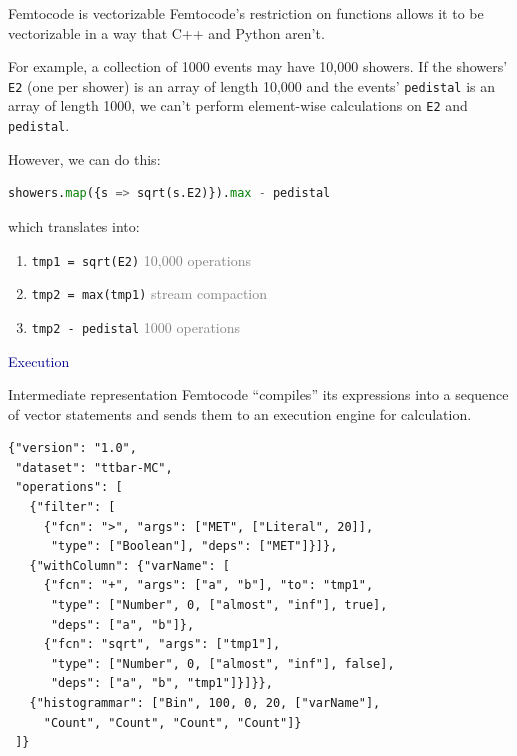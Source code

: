 \documentclass{beamer}
\begin{document}
\begin{frame}[fragile]{Femtocode is vectorizable}
\vspace{0.5 cm}
Femtocode's restriction on functions allows it to be vectorizable in a way that C++ and Python aren't.

\vspace{0.25 cm}
For example, a collection of 1000 events may have 10,000 showers. If the showers' {\small\tt E2} (one per shower) is an array of length 10,000 and the events' {\small\tt pedistal} is an array of length 1000, we can't perform element-wise calculations on {\small\tt E2} and {\small\tt pedistal}.

\vspace{0.25 cm}
However, we can do this:

\vspace{-0.25 cm}
\begin{center}
\begin{minipage}{0.9\linewidth}
\small
\begin{lstlisting}[language=python]
showers.map({s => sqrt(s.E2)}).max - pedistal
\end{lstlisting}
\end{minipage}
\end{center}

\vspace{-0.25 cm}
which translates into:
\begin{enumerate}
\item {\small\tt tmp1 = sqrt(E2)} \hfill \textcolor{gray}{10,000 operations}
\item {\small\tt tmp2 = max(tmp1)} \hfill \textcolor{gray}{stream compaction}
\item {\small\tt tmp2 - pedistal} \hfill \textcolor{gray}{1000 operations}
\end{enumerate}
\end{frame}

\begin{frame}{}
\begin{center}
\textcolor{darkblue}{\huge Execution}
\end{center}
\end{frame}

\begin{frame}[fragile]{Intermediate representation}
\vspace{0.4 cm}
Femtocode ``compiles'' its expressions into a sequence of vector statements and sends them to an execution engine for calculation.

\small
\begin{verbatim}
{"version": "1.0",
 "dataset": "ttbar-MC",
 "operations": [
   {"filter": [
     {"fcn": ">", "args": ["MET", ["Literal", 20]],
      "type": ["Boolean"], "deps": ["MET"]}]},
   {"withColumn": {"varName": [
     {"fcn": "+", "args": ["a", "b"], "to": "tmp1",
      "type": ["Number", 0, ["almost", "inf"], true],
      "deps": ["a", "b"]},
     {"fcn": "sqrt", "args": ["tmp1"],
      "type": ["Number", 0, ["almost", "inf"], false],
      "deps": ["a", "b", "tmp1"]}]}},
   {"histogrammar": ["Bin", 100, 0, 20, ["varName"],
     "Count", "Count", "Count", "Count"]}
 ]}
\end{verbatim}
\end{frame}
\end{document}
